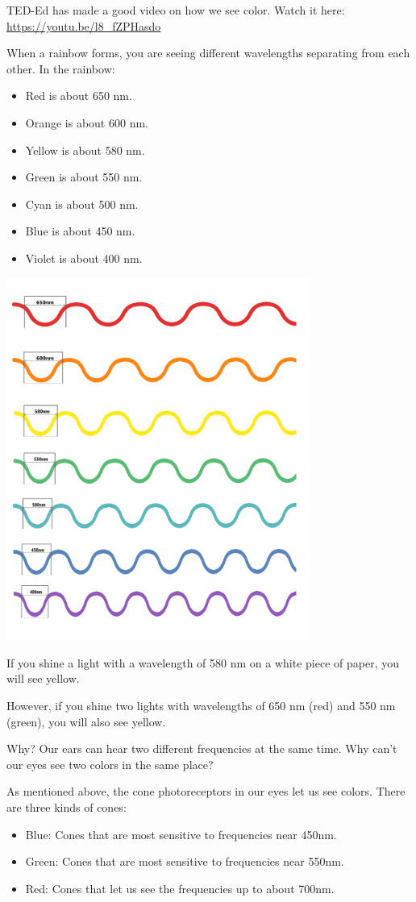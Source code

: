 TED-Ed has made a good video on how we see color. Watch it here: \url{https://youtu.be/l8_fZPHasdo}

When a rainbow forms, you are seeing different wavelengths separating from each other. In the rainbow:
\begin{itemize}
\item Red is about 650 nm.
\item Orange is about 600 nm.
\item Yellow is about 580 nm.
\item Green is about 550 nm.
\item Cyan is about 500 nm.
\item Blue is about 450 nm.
\item Violet is about 400 nm.
\end{itemize}

\includegraphics[width=0.75\textwidth]{Color_Waves.png}

If you shine a light with a wavelength of 580 nm on a white piece of
paper, you will see yellow.

However, if you shine two lights with wavelengths of 650 nm (red) and
550 nm (green), you will also see yellow.

Why? Our ears can hear two different frequencies at the same time.
Why can't our eyes see two colors in the same place?

As mentioned above, the cone photoreceptors in our eyes let us see
colors. There are three kinds of cones:
\begin{itemize}
  \item Blue: Cones that are most sensitive to frequencies near 450nm.
  \item Green: Cones that are most sensitive to frequencies near 550nm.
  \item Red: Cones that let us see the frequencies up to about 700nm.
\end{itemize}

